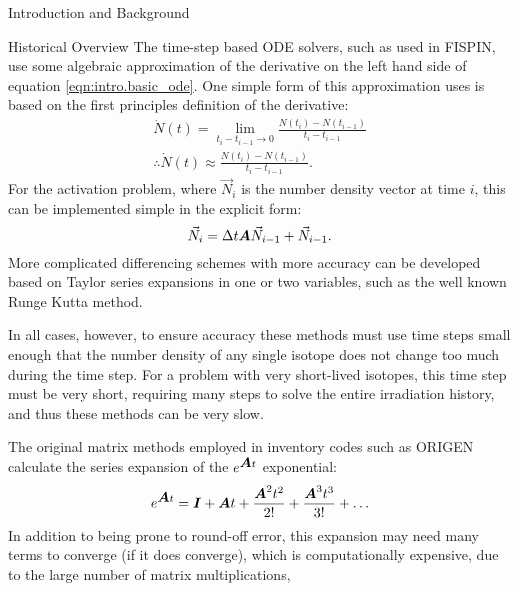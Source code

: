 \begin{chapter}{Introduction and Background}
\begin{section}{Historical Overview}
  The time-step based ODE solvers, such as used in FISPIN, use some
  algebraic approximation of the derivative on the left hand side of
  equation \ref{eqn:intro.basic_ode}.  One simple form of this
  approximation uses is based on the first principles definition of
  the derivative:
  \begin{equation*}
    \begin{split}
      \dot{N}(t) = \lim_{t_i - t_{i-1} \rightarrow 0} \frac{N(t_i)
        - N(t_{i-1})}{t_i - t_{i-1}}\\
      \therefore \dot{N}(t) \approx \frac{N(t_i)
        - N(t_{i-1})}{t_i - t_{i-1}}.
    \end{split}
  \end{equation*}
  For the activation problem, where $\vec{N}_i$ is the number density
  vector at time $i$, this can be implemented simple in the explicit
  form:
  \begin{equation}
    \label{eqn:intro.time-step}
    \vec{N}_i = \Delta t \mbox{\boldmath $A$}\vec{N}_{i-1} + \vec{N}_{i-1}.
  \end{equation}
  More complicated differencing schemes with more accuracy can be
  developed based on Taylor series expansions in one or two variables,
  such as the well known Runge Kutta method.
  
  In all cases, however, to ensure accuracy these methods must use
  time steps small enough that the number density of any single
  isotope does not change too much during the time step.  For a
  problem with very short-lived isotopes, this time step must be very
  short, requiring many steps to solve the entire irradiation
  history, and thus these methods can be very slow.
  
  The original matrix methods employed in inventory codes such as
  ORIGEN calculate the series expansion of the $e^{\mbox{\boldmath $A$}t}$
  exponential:
  \begin{equation*}
    e^{\mbox{\boldmath $A$}t} = \mbox{\boldmath $I$} + \mbox{\boldmath $A$}t + \frac{\mbox{\boldmath $A$}^2t^2}{2!} +
    \frac{\mbox{\boldmath $A$}^3t^3}{3!} + \ldots
  \end{equation*}
  In addition to being prone to round-off error, this expansion may
  need many terms to converge (if it does converge), which is
  computationally expensive, due to the large number of matrix
  multiplications,
  

\end{section}
\end{chapter}

